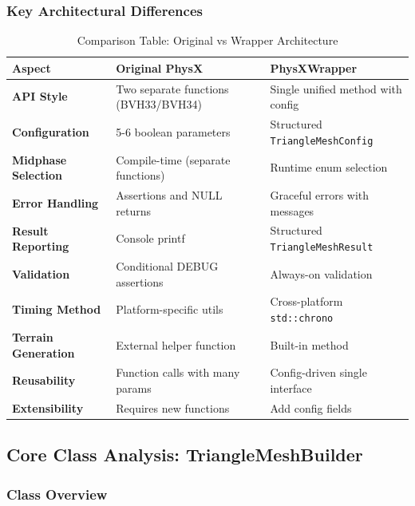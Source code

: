 \subsubsection{Key Architectural Differences}

\begin{table}[h]
\centering
\small
\begin{tabular}{|p{4cm}|p{5cm}|p{5cm}|}
\hline
\textbf{Aspect} & \textbf{Original PhysX} & \textbf{PhysXWrapper} \\
\hline
\textbf{API Style} & Two separate functions (BVH33/BVH34) & Single unified method with config \\
\hline
\textbf{Configuration} & 5-6 boolean parameters & Structured \texttt{TriangleMeshConfig} \\
\hline
\textbf{Midphase Selection} & Compile-time (separate functions) & Runtime enum selection \\
\hline
\textbf{Error Handling} & Assertions and NULL returns & Graceful errors with messages \\
\hline
\textbf{Result Reporting} & Console printf & Structured \texttt{TriangleMeshResult} \\
\hline
\textbf{Validation} & Conditional DEBUG assertions & Always-on validation \\
\hline
\textbf{Timing Method} & Platform-specific utils & Cross-platform \texttt{std::chrono} \\
\hline
\textbf{Terrain Generation} & External helper function & Built-in method \\
\hline
\textbf{Reusability} & Function calls with many params & Config-driven single interface \\
\hline
\textbf{Extensibility} & Requires new functions & Add config fields \\
\hline
\end{tabular}
\caption{Comparison Table: Original vs Wrapper Architecture}
\end{table}


\subsection{Core Class Analysis: TriangleMeshBuilder}

\subsubsection{Class Overview}


